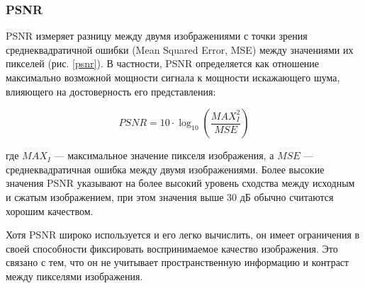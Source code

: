 \subsubsection{PSNR}\label{sect-4-3-1}

PSNR измеряет разницу между двумя изображениями с точки зрения среднеквадратичной ошибки (Mean Squared Error, MSE) между значениями их пикселей (рис. \ref{psnr}). В частности, PSNR определяется как отношение максимально возможной мощности сигнала к мощности искажающего шума, влияющего на достоверность его представления:

\begin{equation}
    \label{eq:1-3-1}
    PSNR = 10 \cdot \log_{10} \left( \frac{MAX_I^2}{MSE} \right)
\end{equation}


где $MAX_I$ — максимальное значение пикселя изображения, а $MSE$ — среднеквадратичная ошибка между двумя изображениями. Более высокие значения PSNR указывают на более высокий уровень сходства между исходным и сжатым изображением, при этом значения выше 30 дБ обычно считаются хорошим качеством.


Хотя PSNR широко используется и его легко вычислить, он имеет ограничения в своей способности фиксировать воспринимаемое качество изображения. Это связано с тем, что он не учитывает пространственную информацию и контраст между пикселями изображения. 

